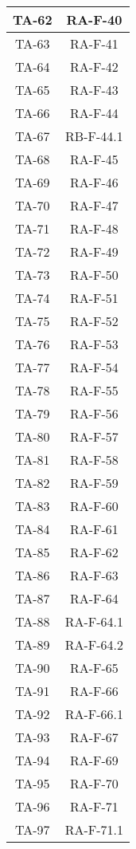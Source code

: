 \begin{center}
\begin{longtable}{|c|c|}
			\hline
			TA-62 & RA-F-40 \\
			\hline
			TA-63 & RA-F-41 \\
			\hline
			TA-64 & RA-F-42 \\
			\hline
			TA-65 & RA-F-43 \\
			\hline
			TA-66 & RA-F-44 \\
			\hline
			TA-67 & RB-F-44.1 \\
			\hline
			TA-68 & RA-F-45 \\
			\hline
			TA-69 & RA-F-46 \\
			\hline
			TA-70 & RA-F-47 \\
			\hline
			TA-71 & RA-F-48 \\
			\hline
			TA-72 & RA-F-49 \\
			\hline
			TA-73 & RA-F-50 \\
			\hline
			TA-74 & RA-F-51 \\
			\hline
			TA-75 & RA-F-52 \\
			\hline
			TA-76 & RA-F-53 \\
			\hline
			TA-77 & RA-F-54 \\
			\hline
			TA-78 & RA-F-55 \\
			\hline
			TA-79 & RA-F-56 \\
			\hline
			TA-80 & RA-F-57 \\
			\hline
			TA-81 & RA-F-58 \\
			\hline
			TA-82 & RA-F-59 \\
			\hline
			TA-83 & RA-F-60 \\
			\hline
			TA-84 & RA-F-61 \\
			\hline
			TA-85 & RA-F-62 \\
			\hline
			TA-86 & RA-F-63 \\
			\hline
			TA-87 & RA-F-64 \\
			\hline
			TA-88 & RA-F-64.1 \\
			\hline
			TA-89 & RA-F-64.2 \\
			\hline
			TA-90 & RA-F-65 \\
			\hline
			TA-91 & RA-F-66 \\
			\hline
			TA-92 & RA-F-66.1 \\
			\hline
			TA-93 & RA-F-67 \\
			\hline
			TA-94 & RA-F-69 \\
			\hline
			TA-95 & RA-F-70 \\
			\hline
			TA-96 & RA-F-71 \\
			\hline
			TA-97 & RA-F-71.1 \\

\end{longtable}
\end{center}
